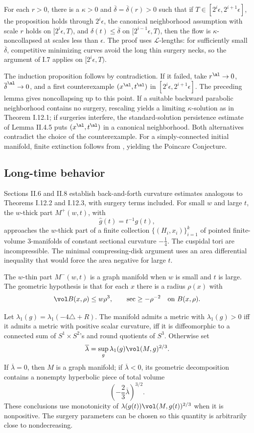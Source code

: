 For each $r>0$, there is a $\kappa>0$ and
$\overline\delta=\overline\delta(r)>0$ such that if
$T\in[2^i\epsilon,2^{i+1}\epsilon]$, the proposition holds through
$2^i\epsilon$, the canonical neighborhood assumption with scale $r$ holds
on $[2^i\epsilon,T)$, and $\delta(t)\le\overline\delta$ on
$[2^{i-1}\epsilon,T)$, then the flow is $\kappa$-noncollapsed at scales less
than $\epsilon$. The proof uses ${\mathcal L}$-lengths: for sufficiently
small $\overline\delta$, competitive minimizing curves avoid the long thin
surgery necks, so the argument of I.7 applies on $[2^i\epsilon,T)$.

The induction proposition follows by contradiction. If it failed, take
$r^\al\to0$, $\overline\delta^\al\to0$, and a first counterexample
$(x^\al,t^\al)$ in $[2^i\epsilon,2^{i+1}\epsilon]$. The preceding lemma gives
noncollapsing up to this point. If a suitable backward parabolic neighborhood
contains no surgery, rescaling yields a limiting $\kappa$-solution as in
Theorem I.12.1; if surgeries interfere, the standard-solution persistence
estimate of Lemma II.4.5 puts $(x^\al,t^\al)$ in a canonical neighborhood.
Both alternatives contradict the choice of the counterexample. For a
simply-connected initial manifold, finite extinction follows from
\cite{Colding-Minicozzi,Colding-Minicozzi2,Perelman3}, yielding the
Poincare Conjecture.

\subsection{Long-time behavior}

Sections II.6 and II.8 establish back-and-forth curvature estimates analogous
to Theorems I.12.2 and I.12.3, with surgery terms included. For small $w$ and
large $t$, the $w$-thick part $M^+(w,t)$, with
\[
\widehat g(t)=t^{-1}g(t),
\]
approaches the $w$-thick part of a finite collection
$\{(H_i,x_i)\}_{i=1}^k$ of pointed finite-volume $3$-manifolds of constant
sectional curvature $-\frac14$. The cuspidal tori are incompressible. The
minimal compressing-disk argument uses an area differential inequality that
would force the area negative for large $t$.

The $w$-thin part $M^-(w,t)$ is a graph manifold when $w$ is small and $t$ is
large. The geometric hypothesis is that for each $x$ there is a radius
$\rho(x)$ with
\[
\vol B(x,\rho)\le w\rho^3,
\qquad
\sec\ge-\rho^{-2}\quad\text{on }B(x,\rho).
\]

Let $\lambda_1(g)=\lambda_1(-4\triangle+R)$. The manifold admits a metric
with $\lambda_1(g)>0$ iff it admits a metric with positive scalar curvature,
iff it is diffeomorphic to a connected sum of $S^1\times S^2$'s and round
quotients of $S^3$. Otherwise set
\[
\overline\lambda=\sup_g\lambda_1(g)\vol(M,g)^{2/3}.
\]
If $\overline\lambda=0$, then $M$ is a graph manifold; if
$\overline\lambda<0$, its geometric decomposition contains a nonempty
hyperbolic piece of total volume
\[
\left(-\frac23\overline\lambda\right)^{3/2}.
\]
These conclusions use monotonicity of
$\lambda(g(t))\vol(M,g(t))^{2/3}$ when it is nonpositive. The surgery
parameters can be chosen so this quantity is arbitrarily close to
nondecreasing.

